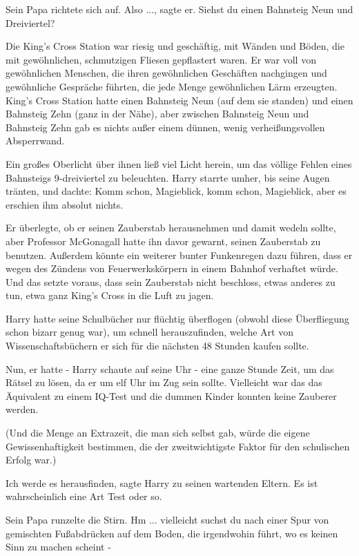 Sein Papa richtete sich auf. \glqq{}Also ...\grqq{}, sagte er. \glqq{}Siehst du
einen Bahnsteig Neun und Dreiviertel?\grqq{}

Die King's Cross Station war riesig und geschäftig, mit Wänden und Böden, die
mit gewöhnlichen, schmutzigen Fliesen gepflastert waren. Er war voll von
gewöhnlichen Menschen, die ihren gewöhnlichen Geschäften nachgingen und
gewöhnliche Gespräche führten, die jede Menge gewöhnlichen Lärm erzeugten.
King's Cross Station hatte einen Bahnsteig Neun (auf dem sie standen) und einen
Bahnsteig Zehn (ganz in der Nähe), aber zwischen Bahnsteig Neun und Bahnsteig
Zehn gab es nichts außer einem dünnen, wenig verheißungsvollen Absperrwand.

Ein großes Oberlicht über ihnen ließ viel Licht herein, um das völlige Fehlen
eines Bahnsteigs 9-dreiviertel zu beleuchten. Harry starrte umher, bis seine
Augen tränten, und dachte: Komm schon, Magieblick, komm schon, Magieblick, aber
es erschien ihm absolut nichts.

Er überlegte, ob er seinen Zauberstab herausnehmen und damit wedeln sollte, aber
Professor McGonagall hatte ihn davor gewarnt, seinen Zauberstab zu benutzen.
Außerdem könnte ein weiterer bunter Funkenregen dazu führen, dass er wegen des
Zündens von Feuerwerkskörpern in einem Bahnhof verhaftet würde. Und das setzte
voraus, dass sein Zauberstab nicht beschloss, etwas anderes zu tun, etwa ganz
King's Cross in die Luft zu jagen.

Harry hatte seine Schulbücher nur flüchtig überflogen (obwohl diese Überfliegung
schon bizarr genug war), um schnell herauszufinden, welche Art von
Wissenschaftsbüchern er sich für die nächsten 48 Stunden kaufen sollte.

Nun, er hatte - Harry schaute auf seine Uhr - eine ganze Stunde Zeit, um das
Rätsel zu lösen, da er um elf Uhr im Zug sein sollte. Vielleicht war das das
Äquivalent zu einem IQ-Test und die dummen Kinder konnten keine Zauberer werden.

(Und die Menge an Extrazeit, die man sich selbst gab, würde die eigene
Gewissenhaftigkeit bestimmen, die der zweitwichtigste Faktor für den schulischen
Erfolg war.)

\glqq{}Ich werde es herausfinden\grqq{}, sagte Harry zu seinen wartenden Eltern.
\glqq{}Es ist wahrscheinlich eine Art Test oder so.\grqq{}

Sein Papa runzelte die Stirn. \glqq{}Hm ... vielleicht suchst du nach einer
Spur von gemischten Fußabdrücken auf dem Boden, die irgendwohin führt, wo es
keinen Sinn zu machen scheint -\grqq{}

